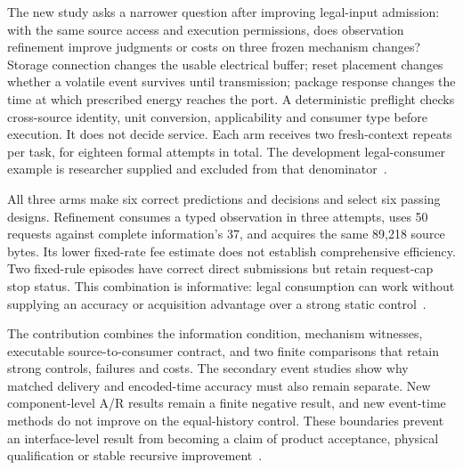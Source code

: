 The new study asks a narrower question after improving legal-input admission:
with the same source access and execution permissions, does observation
refinement improve judgments or costs on three frozen mechanism changes?
Storage connection changes the usable electrical buffer; reset placement
changes whether a volatile event survives until transmission; package response
changes the time at which prescribed energy reaches the port. A deterministic
preflight checks cross-source identity, unit conversion, applicability and
consumer type before execution. It does not decide service. Each arm receives
two fresh-context repeats per task, for eighteen formal attempts in total.
The development legal-consumer example is researcher supplied and excluded
from that denominator~\cite{abcfirst,abcb,abcaudit}.

All three arms make six correct predictions and decisions and select six
passing designs. Refinement consumes a typed observation in three attempts,
uses 50 requests against complete information's 37, and acquires the same
89,218 source bytes. Its lower fixed-rate fee estimate does not establish
comprehensive efficiency. Two fixed-rule episodes have correct direct
submissions but retain request-cap stop status. This combination is informative:
legal consumption can work without supplying an accuracy or acquisition
advantage over a strong static control~\cite{abcb,abcreview}.

The contribution combines the information condition, mechanism witnesses,
executable source-to-consumer contract, and two finite comparisons that retain
strong controls, failures and costs. The secondary event studies show why
matched delivery and encoded-time accuracy must also remain separate. New
component-level A/R results remain a finite negative result, and new event-time
methods do not improve on the equal-history control. These boundaries prevent
an interface-level result from becoming a claim of product acceptance, physical
qualification or stable recursive improvement~\cite{final,abca,abcc}.

